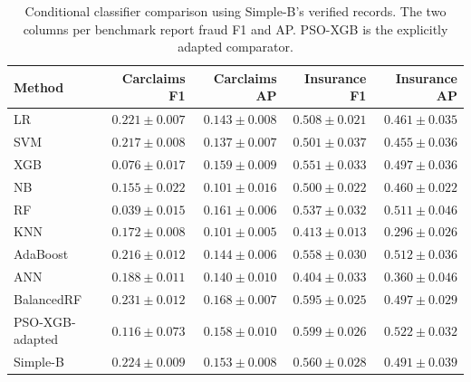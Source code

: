 \begin{table}[!htbp]\centering\footnotesize
\caption{Conditional classifier comparison using Simple-B's verified records. The two columns per benchmark report fraud F1 and AP. PSO-XGB is the explicitly adapted comparator.}\label{tab:baselines}
\setlength{\tabcolsep}{2pt}
\begin{tabular}{lrrrr}\toprule
Method & Carclaims F1 & Carclaims AP & Insurance F1 & Insurance AP\\\midrule
LR & $0.221 \pm 0.007$ & $0.143 \pm 0.008$ & $0.508 \pm 0.021$ & $0.461 \pm 0.035$\\
SVM & $0.217 \pm 0.008$ & $0.137 \pm 0.007$ & $0.501 \pm 0.037$ & $0.455 \pm 0.036$\\
XGB & $0.076 \pm 0.017$ & $0.159 \pm 0.009$ & $0.551 \pm 0.033$ & $0.497 \pm 0.036$\\
NB & $0.155 \pm 0.022$ & $0.101 \pm 0.016$ & $0.500 \pm 0.022$ & $0.460 \pm 0.022$\\
RF & $0.039 \pm 0.015$ & $0.161 \pm 0.006$ & $0.537 \pm 0.032$ & $0.511 \pm 0.046$\\
KNN & $0.172 \pm 0.008$ & $0.101 \pm 0.005$ & $0.413 \pm 0.013$ & $0.296 \pm 0.026$\\
AdaBoost & $0.216 \pm 0.012$ & $0.144 \pm 0.006$ & $0.558 \pm 0.030$ & $0.512 \pm 0.036$\\
ANN & $0.188 \pm 0.011$ & $0.140 \pm 0.010$ & $0.404 \pm 0.033$ & $0.360 \pm 0.046$\\
BalancedRF & $0.231 \pm 0.012$ & $0.168 \pm 0.007$ & $0.595 \pm 0.025$ & $0.497 \pm 0.029$\\
PSO-XGB-adapted & $0.116 \pm 0.073$ & $0.158 \pm 0.010$ & $0.599 \pm 0.026$ & $0.522 \pm 0.032$\\
Simple-B & $0.224 \pm 0.009$ & $0.153 \pm 0.008$ & $0.560 \pm 0.028$ & $0.491 \pm 0.039$\\
\bottomrule\end{tabular}
\end{table}
